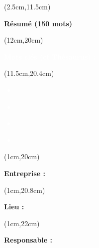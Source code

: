 \begin{titlepage}
    \begin{textblock*}{16cm}(2.5cm,11.5cm)
        \makeatletter
        \noindent
        \normalsize
        \selectfont
        \begin{center}
            \textbf{\textcolor{bleuRoiUTT}{Résumé (150 mots)}}
        \end{center}
        \begin{flushleft}
            \justifying
            \thetitle
        \end{flushleft}
        \makeatother
    \end{textblock*}

    \begin{textblock*}{7.8cm}(12cm,20cm)
        \normalsize
        \begin{center}
            \textbf{\textcolor{white}{Mots clés (cf Thésaurus) :}}
        \end{center}
    \end{textblock*}

    \begin{textblock*}{10cm}(11.5cm,20.4cm)
        \small
        \begin{flushleft}
            \textcolor{white}{
                \begin{itemize}[label=\textcolor{white}{\textbullet}]
                    \item \textbf{\theKone}
                    \item \textbf{\theKtwo}
                    \item \textbf{\theKthree}
                    \item \textbf{\theKfourth}
                \end{itemize}
            }
        \end{flushleft}
    \end{textblock*}

    \begin{textblock*}{7.8cm}(1cm,20cm)
        \normalsize
        \begin{flushleft}
            \textbf{\textcolor{bleuRoiUTT}{Entreprise :} \theEntreprise}
        \end{flushleft}
    \end{textblock*}

    \begin{textblock*}{7.8cm}(1cm,20.8cm)
        \normalsize
        \begin{flushleft}
            \textbf{\textcolor{bleuRoiUTT}{Lieu :} \textit{\mapAddr{\theLieu}}}
        \end{flushleft}
    \end{textblock*}

    \begin{textblock*}{7.8cm}(1cm,22cm)
        \normalsize
        \begin{flushleft}
            \textbf{\textcolor{bleuRoiUTT}{Responsable :} \theREntre}
        \end{flushleft}
    \end{textblock*}

\end{titlepage}

\clearpage %